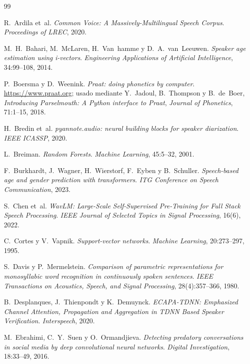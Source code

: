 \documentclass[11pt,a4paper]{article}
\begin{document}
\begin{thebibliography}{99}
\small

 R.~Ardila et~al. \emph{Common Voice: A Massively-Multilingual Speech Corpus}. \emph{Proceedings of LREC}, 2020.

 M.~H.~Bahari, M.~McLaren, H.~Van~hamme y D.~A.~van~Leeuwen. \emph{Speaker age estimation using i-vectors}. \emph{Engineering Applications of Artificial Intelligence}, 34:99--108, 2014.

 P.~Boersma y D.~Weenink. \emph{Praat: doing phonetics by computer}. \url{https://www.praat.org}; usado mediante Y.~Jadoul, B.~Thompson y B.~de~Boer, \emph{Introducing Parselmouth: A Python interface to Praat}, \emph{Journal of Phonetics}, 71:1--15, 2018.

 H.~Bredin et~al. \emph{pyannote.audio: neural building blocks for speaker diarization}. \emph{IEEE ICASSP}, 2020.

 L.~Breiman. \emph{Random Forests}. \emph{Machine Learning}, 45:5--32, 2001.

 F.~Burkhardt, J.~Wagner, H.~Wierstorf, F.~Eyben y B.~Schuller. \emph{Speech-based age and gender prediction with transformers}. \emph{ITG Conference on Speech Communication}, 2023.

 S.~Chen et~al. \emph{WavLM: Large-Scale Self-Supervised Pre-Training for Full Stack Speech Processing}. \emph{IEEE Journal of Selected Topics in Signal Processing}, 16(6), 2022.

 C.~Cortes y V.~Vapnik. \emph{Support-vector networks}. \emph{Machine Learning}, 20:273--297, 1995.

 S.~Davis y P.~Mermelstein. \emph{Comparison of parametric representations for monosyllabic word recognition in continuously spoken sentences}. \emph{IEEE Transactions on Acoustics, Speech, and Signal Processing}, 28(4):357--366, 1980.

 B.~Desplanques, J.~Thienpondt y K.~Demuynck. \emph{ECAPA-TDNN: Emphasized Channel Attention, Propagation and Aggregation in TDNN Based Speaker Verification}. \emph{Interspeech}, 2020.

 M.~Ebrahimi, C.~Y.~Suen y O.~Ormandjieva. \emph{Detecting predatory conversations in social media by deep convolutional neural networks}. \emph{Digital Investigation}, 18:33--49, 2016.


\end{thebibliography}
\end{document}
